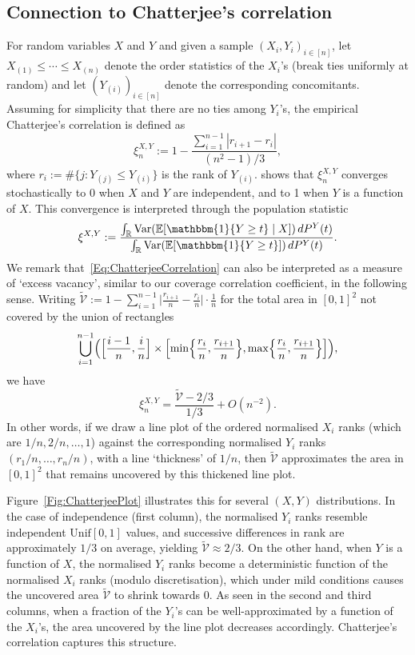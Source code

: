 \documentclass[11pt]{article}
\newcommand{\var}{\mathrm{Var}}
\begin{document}
\subsection{Connection to Chatterjee's correlation}
For random variables $X$ and $Y$ and given a sample $(X_i,Y_i)_{i\in [n]}$,  let $X_{(1)}\leq \cdots\leq X_{(n)}$ denote the order statistics of the $X_i$'s (break ties uniformly at random) and let $(Y_{(i)})_{i\in[n]}$ denote the corresponding concomitants. Assuming for simplicity that there are no ties among $Y_i$'s, the empirical Chatterjee's correlation is defined as 
\begin{equation}
\label{Eq:ChatterjeeCorrelation}
\xi_n^{X,Y}:=1 - \frac{\sum_{i=1}^{n-1}|r_{i+1}-r_i|}{(n^2-1)/3},
\end{equation}
where $r_i := \#\{j: Y_{(j)}\leq Y_{(i)}\}$ is the rank of $Y_{(i)}$. \citet[Theorem~1.1]{chatterjee2021new} shows that $\xi_n^{X,Y}$ converges stochastically to 0 when $X$ and $Y$ are independent, and to 1 when $Y$ is a function of $X$. This convergence is interpreted through the population statistic
\[  
\xi^{X,Y}:= \frac{\int_{\mathbb{R}}\var(\mathbb{E}[\mathbbm{1}\{Y\geq t\}\mid X])\,dP^Y(t)}{\int_{\mathbb{R}}\var(\mathbb{E}[\mathbbm{1}\{Y\geq t\}])\,dP^Y(t)}.
\]
We remark that~\eqref{Eq:ChatterjeeCorrelation} can also be interpreted as a measure of `excess vacancy', similar to our coverage correlation coefficient, in the following sense. Writing $\tilde{\mathcal{V}} := 1 - \sum_{i=1}^{n-1}\bigl|\frac{r_{i+1}}{n}-\frac{r_i}{n}\bigr|\cdot\frac{1}{n}$ for the total area in $[0,1]^2$ not covered by the union of rectangles
\[
\bigcup_{i=1}^{n-1} \Bigl(\Bigl[\frac{i-1}{n},\frac{i}{n}\Bigr] \times \Bigl[\min\Bigl\{\frac{r_i}{n},\frac{r_{i+1}}n\Bigr\}, \max\Bigl\{\frac{r_i}{n},\frac{r_{i+1}}n\Bigr\}\Bigr]\Bigr),
\]
we have 
\[  
\xi_n^{X,Y} = \frac{\tilde{\mathcal{V}} - 2/3}{1/3} + O(n^{-2}).
\]
In other words, if we draw a line plot of the ordered normalised $X_i$ ranks (which are $1/n, 2/n,\ldots, 1$) against the corresponding normalised $Y_i$ ranks $(r_1/n, \ldots, r_n/n)$, with a line `thickness' of $1/n$, then $\tilde{\mathcal{V}}$ approximates the area in $[0,1]^2$ that remains uncovered by this thickened line plot. 

Figure~\ref{Fig:ChatterjeePlot} illustrates this for several $(X,Y)$ distributions. In the case of independence (first column), the normalised $Y_i$ ranks resemble independent $\mathrm{Unif}[0,1]$ values, and successive differences in rank are approximately $1/3$ on average, yielding $\tilde{\mathcal{V}} \approx 2/3$. On the other hand, when $Y$ is a function of $X$, the normalised $Y_i$ ranks become a deterministic function of the normalised $X_i$ ranks (modulo discretisation), which under mild conditions causes the uncovered area $\tilde{\mathcal{V}}$ to shrink towards 0. As seen in the second and third columns, when a fraction of the $Y_i$'s can be well-approximated by a function of the $X_i$'s, the area uncovered by the line plot decreases accordingly. Chatterjee's correlation captures this structure.
\end{document}
